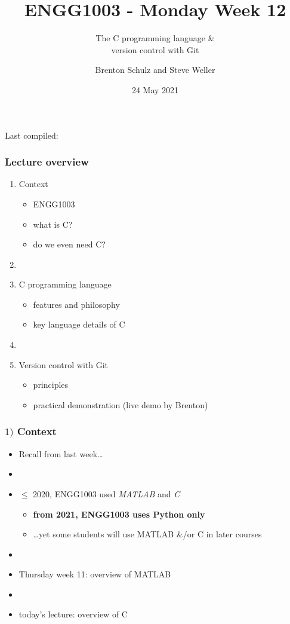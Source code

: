 \documentclass[english,14pt]{beamer}
\title{ENGG1003 - Monday Week 12}
\subtitle{The C programming language \& \\ version control with Git}
\author{Brenton Schulz and Steve Weller}
\institute{University of Newcastle}
\date{24 May 2021}
\newcommand\red[1]{{\color{red} #1}}
\begin{document}
\begin{flushleft}
{\scriptsize Last compiled:~\DTMnow}
\vspace*{-5mm}
\end{flushleft}
\framebreak


\begin{frame}[fragile]

\frametitle{Lecture overview}
\begin{enumerate}
	\item Context
	\begin{itemize}
		\item ENGG1003
		\item what is C?
		\item do we even need C?
	\end{itemize}
	\item[]
		\item C programming language
	\begin{itemize}
		\item features and philosophy
		\item key language details of C
	\end{itemize}
	\item[]
	\item Version control with Git
		\begin{itemize}
			\item principles
			\item practical demonstration (live demo by Brenton)
		\end{itemize}		
\end{enumerate}

\end{frame}


\begin{frame}[fragile]

\frametitle{$1)$ Context}

\begin{itemize}
	\item Recall from last week\ldots
	\item[]
	\item $\leq$ 2020, ENGG1003 used \red{\emph{MATLAB}} and \red{\emph{C}}
	\begin{itemize}
		\item \textbf{from 2021, ENGG1003 uses Python only}
		\item \ldots yet some students will use MATLAB \&/or C in later courses
	\end{itemize}
	\item[]
	\item Thursday week 11: overview of MATLAB
	\item[]
	\item today's lecture: overview of C
\end{itemize}

\end{frame}
\end{document}
